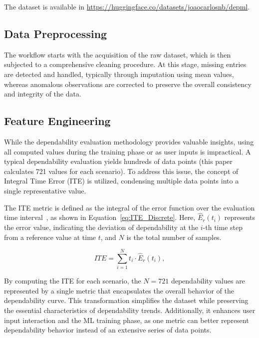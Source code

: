The dataset is available in \url{https://huggingface.co/datasets/joaocarlosnb/depml}.


\subsection{Data Preprocessing}

The workflow starts with the acquisition of the raw dataset, which is then subjected to a comprehensive cleaning procedure. At this stage, missing entries are detected and handled, typically through imputation using mean values, whereas anomalous observations are corrected to preserve the overall consistency and integrity of the data.

\subsection{Feature Engineering}

While the dependability evaluation methodology provides valuable insights, using all computed values during the training phase or as user inputs is impractical. A typical dependability evaluation yields hundreds of data points (this paper calculates 721 values for each scenario). To address this issue, the concept of Integral Time Error (ITE) is utilized, condensing multiple data points into a single representative value.

The ITE metric is defined as the integral of the error function over the evaluation time interval~\cite{ITE2024}, as shown in Equation~\ref{eq:ITE_Discrete}. Here, $\hat{E}_r(t_i)$ represents the error value, indicating the deviation of dependability at the $i$-th time step from a reference value at time $t$, and $N$ is the total number of samples.

\begin{equation} \label{eq:ITE_Discrete}
ITE = \sum_{i=1}^{N} t_i \cdot \hat{E}_r(t_i),
\end{equation}

By computing the ITE for each scenario, the $N = 721$ dependability values are represented by a single metric that encapsulates the overall behavior of the dependability curve. This transformation simplifies the dataset while preserving the essential characteristics of dependability trends. Additionally, it enhances user input interaction and the ML training phase, as one metric can better represent dependability behavior instead of an extensive series of data points.


